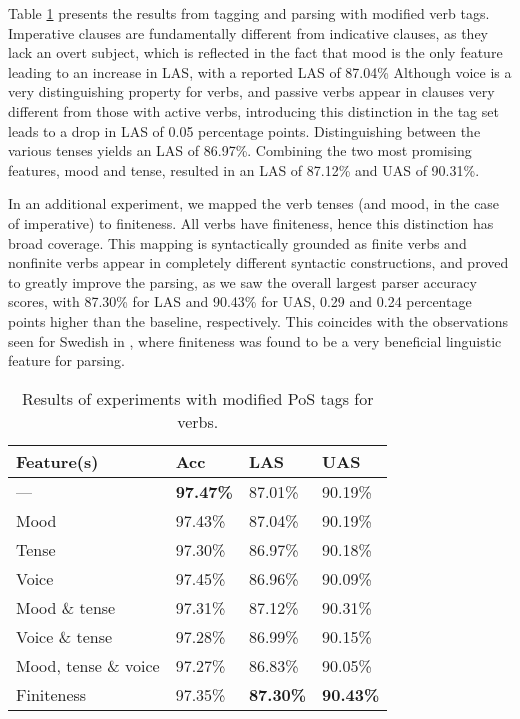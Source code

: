 \documentclass[11pt,a4paper]{article}
\begin{document}
Table \ref{verbresults} presents the results from tagging and parsing with
modified verb tags. Imperative clauses are fundamentally different from
indicative clauses, as they lack an overt subject, which is reflected in the
fact that mood is the only feature leading to an increase in LAS, with a
reported LAS of 87.04\% Although voice is a very distinguishing property for
verbs, and passive verbs appear in clauses very different from those with
active verbs, introducing this distinction in the tag set leads to a drop in
LAS of 0.05 percentage points.  Distinguishing between the various tenses
yields an LAS of 86.97\%. Combining the two most promising features, mood and
tense, resulted in an LAS of 87.12\% and UAS of 90.31\%.

In an additional experiment, we mapped the verb tenses (and mood, in the case
of imperative) to finiteness. All verbs have finiteness, hence this distinction
has broad coverage. This mapping is syntactically grounded as finite verbs and
nonfinite verbs appear in completely different syntactic constructions, and
proved to greatly improve the parsing, as we saw the overall largest parser
accuracy scores, with 87.30\% for LAS and 90.43\% for UAS, 0.29 and 0.24
percentage points higher than the baseline, respectively. This coincides with
the observations seen for Swedish in , where finiteness was
found to be a very beneficial linguistic feature for parsing.

\begin{table}
    \centering
    \smaller[0.5]
    \begin{tabular}{@{}llll@{}}
        \toprule
        \textbf{Feature(s)} & \textbf{Acc} & \textbf{LAS} & \textbf{UAS} \\
        \midrule
        --- & \textbf{97.47\%} & 87.01\% & 90.19\% \\
        Mood & 97.43\% & 87.04\% & 90.19\% \\
        Tense & 97.30\% & 86.97\% & 90.18\% \\
        Voice & 97.45\% & 86.96\% & 90.09\% \\
        Mood \& tense & 97.31\% & 87.12\% & 90.31\% \\
        Voice \& tense & 97.28\% & 86.99\% & 90.15\% \\
        Mood, tense \& voice & 97.27\% & 86.83\% & 90.05\% \\
        Finiteness & 97.35\% & \textbf{87.30\%} & \textbf{90.43\%} \\
        \bottomrule
    \end{tabular}
    \caption{Results of experiments with modified PoS tags for verbs.}
    \label{verbresults}
\end{table}
\end{document}
